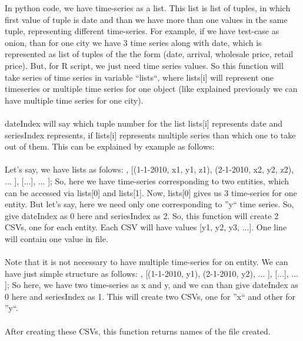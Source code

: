 In python code, we have time-series as a list. This list is list of tuples, in 
which first value of tuple is date and than we have more than one values in the 
same tuple, representing different time-series. For example, if we have 
test-case as onion, than for one city we have 3 time series along with date, 
which is represented as list of tuples of the the form (date, arrival, wholesale 
price, retail price). But, for R script, we just need time series values. So 
this function will take series of time series in variable ``lists``, where 
lists[i] will represent one timeseries or multiple time series for one object 
(like explained previously we can have multiple time series for one city).\\
\\
dateIndex will say which tuple number for the list lists[i] represents date and 
seriesIndex represents, if lists[i] represents multiple series than which one 
to take out of them. This can be explained by example as follows:\\
\\
Let's say, we have lists as folows: \newline
\newline
[ \newline
\hfill  [(1-1-2010, x1, y1, z1), (2-1-2010, x2, y2, z2), ... ], \newline
\hfill  [(1-1-2010, x1, y1, z1), (2-1-2010, x2, y2, z2), ... ], \newline
\hfill  [...], ...  \newline
]; \newline
 \newline
So, here we have time-series corresponding to two entities, which can be 
accessed via lists[0] and lists[1]. Now, lists[0] gives us 3 time-series for 
one entity. But let's say, here we need only one corresponding to ''y`` time 
series. So, give dateIndex as 0 here and seriesIndex as 2. So, this function 
will create 2 CSVs, one for each entity. Each CSV will have values [y1, y2, y3, 
...]. One line will contain one value in file.\\
\\
Note that it is not necessary to have multiple time-series for on entity. We 
can have just simple structure as follows: \newline
\newline
[ \newline
\hspace{1cm}  [(1-1-2010, x1), (2-1-2010, x2), ... ], \newline
\hspace{1cm}  [(1-1-2010, y1), (2-1-2010, y2), ... ], \newline
\hspace{1cm}  [...], ...  \newline
]; \newline
 \newline
So here, we have two time-series as x and y, and we can than give dateIndex as 
0 here and seriesIndex as 1. This will create two CSVs, one for ''x`` and other 
for ''y``.\\
\\
After creating these CSVs, this function returns names of the file created.


